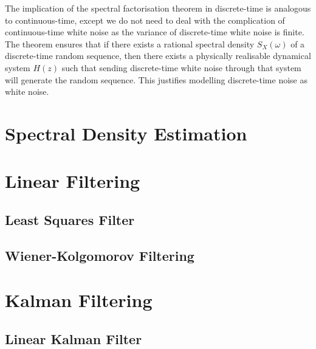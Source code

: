 \documentclass[11pt]{report} %
\begin{document}
The implication of the spectral factorisation theorem in discrete-time is analogous to continuous-time, except we do not need to deal with the complication of continuous-time white noise as the variance of discrete-time white noise is finite. The theorem ensures that if there exists a rational spectral density $S_{X}\left(\omega\right)$ of a discrete-time random sequence, then there exists a physically realisable dynamical system $H\left(z\right)$ such that sending discrete-time white noise through that system will generate the random sequence. This justifies modelling discrete-time noise as white noise.

\section{Spectral Density Estimation}

\section{Linear Filtering}

\subsection{Least Squares Filter}

\subsection{Wiener-Kolgomorov Filtering}

\section{Kalman Filtering}

\subsection{Linear Kalman Filter}
\end{document}
